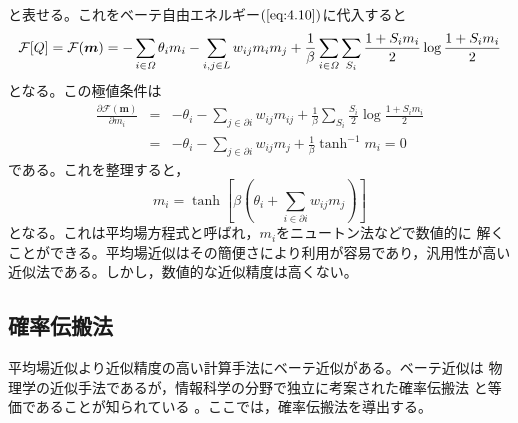 と表せる。これをベーテ自由エネルギー$(\ref{eq:4.10})$に代入すると
\begin{equation}
\mathcal{F}[Q]=\mathcal{F}(\bm{m})=-\sum_{i\in\mathit{\Omega}}
\theta_{i}m_{i}-\sum_{i,j\in L}w_{ij}m_{i}m_{j}
+\frac{1}{\beta}\sum_{i\in\mathit{\Omega}}\sum_{S_{i}}\frac{1+S_{i}m_{i}}{2}
\log\frac{1+S_{i}m_{i}}{2}\label{eq:4.12}
\end{equation}
となる。この極値条件は
\begin{eqnarray}
\frac{\partial\mathcal{F}(\bm{m})}{\partial m_{i}}&=&
-\theta_{i}-\sum_{j\in\partial i}w_{ij}m_{ij}+\frac{1}{\beta}
\sum_{S_{i}}\frac{S_{i}}{2}\log\frac{1+S_{i}m_{i}}{2}\nonumber\\
&=&-\theta_{i}-\sum_{j\in\partial i}w_{ij}m_{j}+\frac{1}{\beta}
\tanh^{-1}m_{i}=0\label{eq:4.13}
\end{eqnarray}
である。これを整理すると，
\begin{equation}
m_{i}=\tanh\left[\beta\left(\theta_{i}+\sum_{i\in\partial
i}w_{ij}m_{j}\right)\right]\label{eq:4.14}
\end{equation}
となる。これは平均場方程式と呼ばれ，$m_{i}$をニュートン法などで数値的に
解くことができる。平均場近似はその簡便さにより利用が容易であり，汎用性が高い
近似法である。しかし，数値的な近似精度は高くない。
\subsection{確率伝搬法}
平均場近似より近似精度の高い計算手法にベーテ近似がある。ベーテ近似は
物理学の近似手法であるが，情報科学の分野で独立に考案された確率伝搬法
と等価であることが知られている\cite{kabashima2004statistical}
\cite{kabashima1999statistical}。ここでは，確率伝搬法を導出する。

